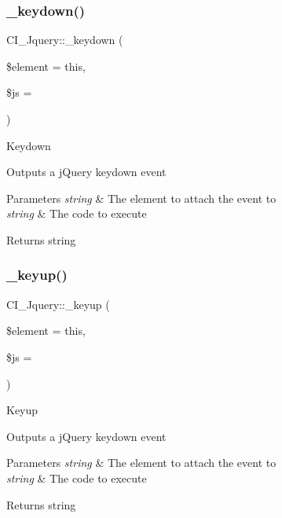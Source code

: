 \subsubsection{\texorpdfstring{\+\_\+keydown()}{\_keydown()}}
{\footnotesize\ttfamily C\+I\+\_\+\+Jquery\+::\+\_\+keydown (\begin{DoxyParamCaption}\item[{}]{\$element = {\ttfamily \textquotesingle{}this\textquotesingle{}},  }\item[{}]{\$js = {\ttfamily \textquotesingle{}\textquotesingle{}} }\end{DoxyParamCaption})\hspace{0.3cm}{\ttfamily [protected]}}

Keydown

Outputs a j\+Query keydown event


\begin{DoxyParams}{Parameters}
{\em string} & The element to attach the event to \\
\hline
{\em string} & The code to execute \\
\hline
\end{DoxyParams}
\begin{DoxyReturn}{Returns}
string 
\end{DoxyReturn}
\mbox{\label{class_c_i___jquery_a6a524f9502e61d9169ac77da754225e2}} 
\subsubsection{\texorpdfstring{\+\_\+keyup()}{\_keyup()}}
{\footnotesize\ttfamily C\+I\+\_\+\+Jquery\+::\+\_\+keyup (\begin{DoxyParamCaption}\item[{}]{\$element = {\ttfamily \textquotesingle{}this\textquotesingle{}},  }\item[{}]{\$js = {\ttfamily \textquotesingle{}\textquotesingle{}} }\end{DoxyParamCaption})\hspace{0.3cm}{\ttfamily [protected]}}

Keyup

Outputs a j\+Query keydown event


\begin{DoxyParams}{Parameters}
{\em string} & The element to attach the event to \\
\hline
{\em string} & The code to execute \\
\hline
\end{DoxyParams}
\begin{DoxyReturn}{Returns}
string 
\end{DoxyReturn}
\mbox{\label{class_c_i___jquery_a419ad0014703b2ca948659d12b5441eb}} 
